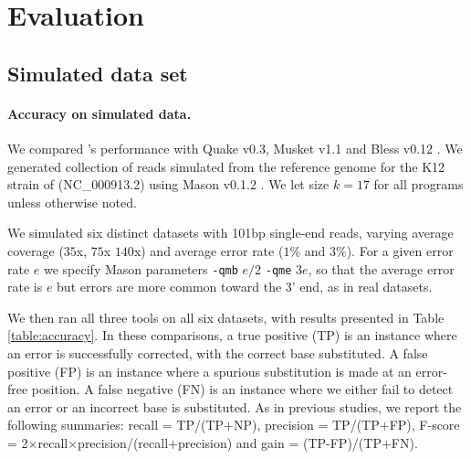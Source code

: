 \documentclass[10pt]{article}
\begin{document}
\section*{Evaluation}
\subsection*{Simulated data set}

\paragraph{Accuracy on simulated data.} We compared \tool's performance with Quake v0.3\cite{kelley2010quake}, Musket v1.1\cite{liu2013musket} and Bless v0.12 \cite{heo2014bless}.  We generated collection of reads simulated from the reference genome for the K12 strain of \ecoli (NC\_000913.2) using Mason v0.1.2 \cite{holtgrewe2010mason}.  We let \kmer size $k=17$ for all programs unless otherwise noted.

We simulated six distinct datasets with 101bp single-end reads, varying average coverage ($35$x, $75$x $140$x) and average error rate ($1\%$ and $3\%$).  For a given error rate $e$ we specify Mason parameters \verb+-qmb+ $e/2$ \verb+-qme+ $3e$, so that the average error rate is $e$ but errors are more common toward the 3' end, as in real datasets.

We then ran all three tools on all six datasets, with results presented in Table \ref{table:accuracy}.  In these comparisons, a true positive (TP) is an instance where an error is successfully corrected, \thatis with the correct base substituted.  A false positive (FP) is an instance where a spurious substitution is made at an error-free position.  A false negative (FN) is an instance where we either fail to detect an error or an incorrect base is substituted.  As in previous studies, we report the following summaries: recall = TP/(TP$+$NP), precision = TP/(TP$+$FP), F-score = 2$\times$recall$\times$precision/(recall$+$precision) and gain = (TP-FP)/(TP+FN).
\end{document}
